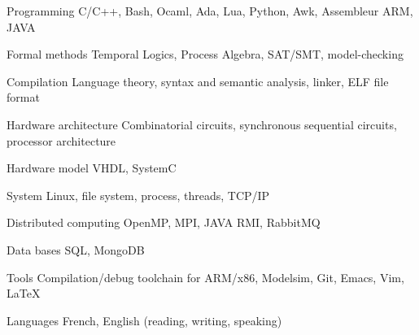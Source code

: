 


\begin{cvskills}


\cvskill
{Programming} %
{C/C++, Bash, Ocaml, Ada, Lua, Python, Awk, Assembleur ARM, JAVA} %


\cvskill
{Formal methods} %
{Temporal Logics, Process Algebra, SAT/SMT, model-checking} %


\cvskill
{Compilation}%
{Language theory, syntax and semantic analysis, linker, ELF file format}

\cvskill
{Hardware architecture}%
{Combinatorial circuits, synchronous sequential circuits, processor architecture}

\cvskill
{Hardware model}%
{VHDL, SystemC}


\cvskill
{System}%
{Linux, file system, process, threads, TCP/IP}


\cvskill
{Distributed computing}%
{OpenMP, MPI, JAVA RMI, RabbitMQ}


\cvskill
{Data bases}%
{SQL, MongoDB}


\cvskill
{Tools}%
{Compilation/debug toolchain for ARM/x86, Modelsim, Git, Emacs, Vim, \LaTeX}


\cvskill
{Languages} %
{French, English (reading, writing, speaking)} %


\end{cvskills}